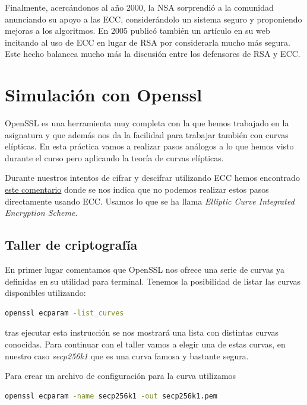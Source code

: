 \documentclass{article}
\begin{document}
Finalmente, acercándonos al año 2000, la NSA sorprendió a la comunidad
anunciando su apoyo a las ECC, considerándolo un sistema seguro y
proponiendo mejoras a los algoritmos. En 2005 publicó también un
artículo en su web incitando al uso de ECC en lugar de RSA por
considerarla mucho más segura. Este hecho balancea mucho más la
discusión entre los defensores de RSA y ECC.

\section{Simulación con Openssl}

OpenSSL es una herramienta muy completa con la que hemos trabajado en la
asignatura y que además nos da la facilidad para trabajar también con curvas
elípticas. En esta práctica vamos a realizar pasos análogos a lo que hemos visto
durante el curso pero aplicando la teoría de curvas elípticas. 

Durante nuestros intentos de cifrar y descifrar utilizando ECC hemos encontrado
\href{https://stackoverflow.com/a/58942471/2588566}{este comentario} donde se
nos indica que no podemos realizar estos pasos directamente usando ECC. Usamos
lo que se ha llama \textit{Elliptic Curve Integrated Encryption Scheme}.

\subsection{Taller de criptografía}

En primer lugar comentamos que OpenSSL nos ofrece una serie de curvas ya
definidas en su utilidad para terminal. Tenemos la posibilidad de listar las
curvas disponibles utilizando:

\begin{lstlisting}[language=bash]
  openssl ecparam -list_curves
\end{lstlisting}

tras ejecutar esta instrucción se nos mostrará una lista con distintas curvas
conocidas. Para continuar con el taller vamos a elegir una de estas curvas,
en nuestro caso \textit{secp256k1} que es una curva famosa y bastante segura.

Para crear un archivo de configuración para la curva utilizamos 

\begin{lstlisting}[language=bash]
  openssl ecparam -name secp256k1 -out secp256k1.pem
\end{lstlisting}
\end{document}
